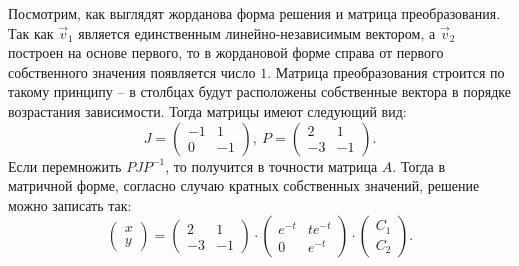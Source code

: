 		Посмотрим, как выглядят жорданова форма решения и матрица преобразования. Так как $\vec{v}_1$ является единственным линейно-независимым вектором, а $\vec{v}_2$ построен на основе первого, то в жордановой форме справа от первого собственного значения появляется число $1$. Матрица преобразования строится по такому принципу -- в столбцах будут расположены собственные вектора в порядке возрастания зависимости. Тогда матрицы имеют следующий вид:
		\[ J = \begin{pmatrix} -1 & 1 \\ 0 & -1 \end{pmatrix}, ~ P = \begin{pmatrix} 2 & 1 \\ -3 & -1 \end{pmatrix}. \]
		Если перемножить $PJP^{-1}$, то получится в точности матрица $A$. Тогда в матричной форме, согласно случаю кратных собственных значений, решение можно записать так:
		\[ \begin{pmatrix} x \\ y \end{pmatrix} = \begin{pmatrix} 2 & 1 \\ -3 & -1 \end{pmatrix} \cdot \begin{pmatrix} e^{-t} & t e^{-t} \\ 0 & e^{-t} \end{pmatrix} \cdot \begin{pmatrix} C_1 \\ C_2 \end{pmatrix}. \]

